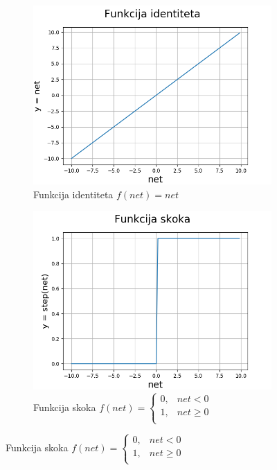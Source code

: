 \documentclass[times, utf8, diplomski]{fer}
\theoremstyle{definition}
\begin{document}
\begin{figure}
\begin{subfigure}[t]{.5\textwidth}
\centering
\includegraphics[width=\linewidth]{funkcija_identiteta.png}
\caption{Funkcija identiteta $f(net) = net$}
\end{subfigure}
\hfill
\begin{subfigure}[t]{.5\textwidth}
\centering
\includegraphics[width=\linewidth]{step_funkcija.png}
\caption{Funkcija skoka
$
f(net) = \begin{cases}
0, & net < 0\\
1, & net \geq 0\\
\end{cases}
$
}
\end{subfigure}
\medskip


\end{figure}
\end{document}
